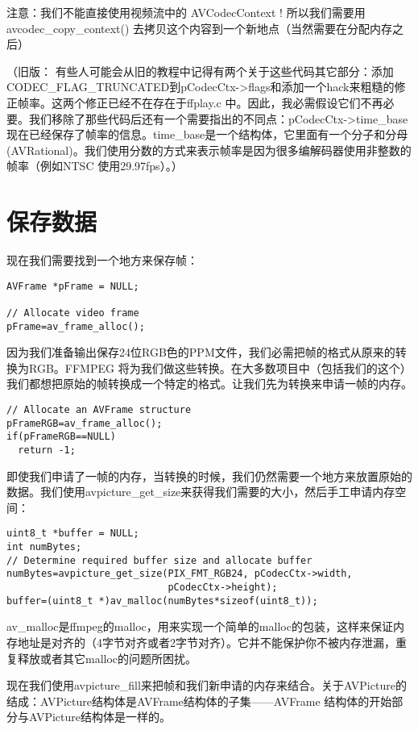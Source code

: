 注意：我们不能直接使用视频流中的 AVCodecContext ! 所以我们需要用 avcodec_copy_context() 去拷贝这个内容到一个新地点（当然需要在分配内存之后）

（旧版： 有些人可能会从旧的教程中记得有两个关于这些代码其它部分：添加CODEC_FLAG_TRUNCATED到pCodecCtx->flags和添加一个hack来粗糙的修正帧率。这两个修正已经不在存在于ffplay.c 中。因此，我必需假设它们不再必要。我们移除了那些代码后还有一个需要指出的不同点：pCodecCtx->time_base 现在已经保存了帧率的信息。time_base是一个结构体，它里面有一个分子和分母(AVRational)。我们使用分数的方式来表示帧率是因为很多编解码器使用非整数的帧率（例如NTSC 使用29.97fps）。）

\section{保存数据}

现在我们需要找到一个地方来保存帧：
\begin{lstlisting}
AVFrame *pFrame = NULL;

// Allocate video frame
pFrame=av_frame_alloc();
\end{lstlisting}

因为我们准备输出保存24位RGB色的PPM文件，我们必需把帧的格式从原来的转换为RGB。FFMPEG 将为我们做这些转换。在大多数项目中（包括我们的这个）我们都想把原始的帧转换成一个特定的格式。让我们先为转换来申请一帧的内存。
\begin{lstlisting}
// Allocate an AVFrame structure
pFrameRGB=av_frame_alloc();
if(pFrameRGB==NULL)
  return -1;
\end{lstlisting}

即使我们申请了一帧的内存，当转换的时候，我们仍然需要一个地方来放置原始的数据。我们使用avpicture_get_size来获得我们需要的大小，然后手工申请内存空间：

\begin{lstlisting}
uint8_t *buffer = NULL;
int numBytes;
// Determine required buffer size and allocate buffer
numBytes=avpicture_get_size(PIX_FMT_RGB24, pCodecCtx->width,
                            pCodecCtx->height);
buffer=(uint8_t *)av_malloc(numBytes*sizeof(uint8_t));
\end{lstlisting}

av_malloc是ffmpeg的malloc，用来实现一个简单的malloc的包装，这样来保证内存地址是对齐的（4字节对齐或者2字节对齐）。它并不能保护你不被内存泄漏，重复释放或者其它malloc的问题所困扰。

现在我们使用avpicture_fill来把帧和我们新申请的内存来结合。关于AVPicture的结成：AVPicture结构体是AVFrame结构体的子集——AVFrame 结构体的开始部分与AVPicture结构体是一样的。


